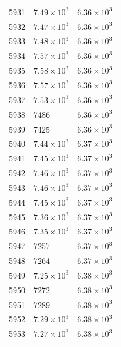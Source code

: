 \begin{table}[H]
\begin{tabular}{lll}
5931 & $\displaystyle 7.49 \times 10^{3}$ & $\displaystyle 6.36 \times 10^{3}$ \\
5932 & $\displaystyle 7.47 \times 10^{3}$ & $\displaystyle 6.36 \times 10^{3}$ \\
5933 & $\displaystyle 7.48 \times 10^{3}$ & $\displaystyle 6.36 \times 10^{3}$ \\
5934 & $\displaystyle 7.57 \times 10^{3}$ & $\displaystyle 6.36 \times 10^{3}$ \\
5935 & $\displaystyle 7.58 \times 10^{3}$ & $\displaystyle 6.36 \times 10^{3}$ \\
5936 & $\displaystyle 7.57 \times 10^{3}$ & $\displaystyle 6.36 \times 10^{3}$ \\
5937 & $\displaystyle 7.53 \times 10^{3}$ & $\displaystyle 6.36 \times 10^{3}$ \\
5938 & 7486 & $\displaystyle 6.36 \times 10^{3}$ \\
5939 & 7425 & $\displaystyle 6.36 \times 10^{3}$ \\
5940 & $\displaystyle 7.44 \times 10^{3}$ & $\displaystyle 6.37 \times 10^{3}$ \\
5941 & $\displaystyle 7.45 \times 10^{3}$ & $\displaystyle 6.37 \times 10^{3}$ \\
5942 & $\displaystyle 7.46 \times 10^{3}$ & $\displaystyle 6.37 \times 10^{3}$ \\
5943 & $\displaystyle 7.46 \times 10^{3}$ & $\displaystyle 6.37 \times 10^{3}$ \\
5944 & $\displaystyle 7.45 \times 10^{3}$ & $\displaystyle 6.37 \times 10^{3}$ \\
5945 & $\displaystyle 7.36 \times 10^{3}$ & $\displaystyle 6.37 \times 10^{3}$ \\
5946 & $\displaystyle 7.35 \times 10^{3}$ & $\displaystyle 6.37 \times 10^{3}$ \\
5947 & 7257 & $\displaystyle 6.37 \times 10^{3}$ \\
5948 & 7264 & $\displaystyle 6.37 \times 10^{3}$ \\
5949 & $\displaystyle 7.25 \times 10^{3}$ & $\displaystyle 6.38 \times 10^{3}$ \\
5950 & 7272 & $\displaystyle 6.38 \times 10^{3}$ \\
5951 & 7289 & $\displaystyle 6.38 \times 10^{3}$ \\
5952 & $\displaystyle 7.29 \times 10^{3}$ & $\displaystyle 6.38 \times 10^{3}$ \\
5953 & $\displaystyle 7.27 \times 10^{3}$ & $\displaystyle 6.38 \times 10^{3}$ \\

\end{tabular}
\end{table}
